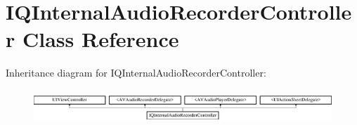 \hypertarget{interface_i_q_internal_audio_recorder_controller}{}\section{I\+Q\+Internal\+Audio\+Recorder\+Controller Class Reference}
\label{interface_i_q_internal_audio_recorder_controller}
Inheritance diagram for I\+Q\+Internal\+Audio\+Recorder\+Controller\+:\begin{figure}[H]
\begin{center}
\leavevmode
\includegraphics[height=1.290323cm]{interface_i_q_internal_audio_recorder_controller}
\end{center}
\end{figure}
